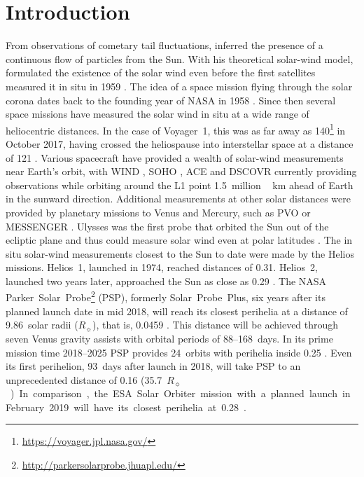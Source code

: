 \documentclass[]{aa}
\newcommand{\Rs}{$R_\sun{}$}
\begin{document}
        \maketitle

        \section{Introduction}
        From observations of cometary tail fluctuations, \citet{Biermann1951} inferred the presence of a continuous flow of particles from the Sun. With his theoretical solar-wind model, \citet{Parker1958} formulated the existence of the solar wind even before the first satellites measured it in situ in 1959 \citep{Gringauz1960,Neugebauer1966}.
        The idea of a space mission flying through the solar corona dates back to the founding year of NASA in 1958 \citep{McComas2008}. Since then several space missions have measured the solar wind in situ at a wide range of heliocentric distances. In the case of Voyager~1, this was as far away as \SI{140}{\au}\footnote{\url{https://voyager.jpl.nasa.gov/}} in October 2017, having crossed the heliospause into interstellar space at a distance of \SI{121}{\au} \citep{Gurnett2013}.
        Various spacecraft have provided a wealth of solar-wind measurements near Earth’s orbit, with WIND \citep{Lepping1995,Ogilvie1995}, SOHO \citep{Domingo1995}, ACE \citep{Stone1998} and DSCOVR \citep{Burt2012} currently providing observations while orbiting around the L1 point \SI{1.5}{million\,\km} ahead of Earth in the sunward direction. Additional measurements at other solar distances were provided by planetary missions to Venus and Mercury, such as PVO \citep{Colin1980} or MESSENGER \citep{Belcher1991}. Ulysses was the first probe that orbited the Sun out of the ecliptic plane and thus could measure solar wind even at polar latitudes \citep{McComas1998}. The in situ solar-wind measurements closest to the Sun to date were made by the Helios missions. Helios~1, launched in 1974, reached distances of \SI{0.31}{\au}. Helios~2, launched two years later, approached the Sun as close as \SI{0.29}{\au} \citep{Rosenbauer1977}.
        The NASA Parker~Solar~Probe\footnote{\url{http://parkersolarprobe.jhuapl.edu/}} (PSP), formerly Solar~Probe~Plus, six years after its planned launch date in mid 2018, will reach its closest perihelia at a distance of 9.86~solar radii (\Rs), that is, \SI{0.0459}{\au} \citep{Fox2015}. This distance will be achieved through seven Venus gravity assists with orbital periods of 88--168~days. In its prime mission time 2018--2025 PSP provides 24~orbits with perihelia inside \SI{0.25}{\au} \citep{Fox2015}. Even its first perihelion, 93~days after launch in 2018, will take PSP to an unprecedented distance of \SI{0.16}{\au} (\SI{35.7}{\Rs}). In comparison, the ESA Solar Orbiter mission with a planned launch in February 2019 will have its closest perihelia at \SI{0.28}{\au} \citep{Muller2013}.
\end{document}
